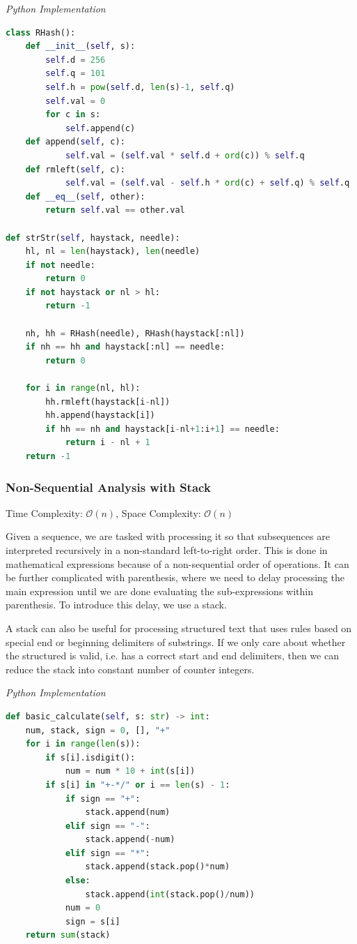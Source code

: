\documentclass{article}
\newcommand{\bigO}{\mathcal{O}}
\begin{document}
\vspace{8pt} \emph{Python Implementation}
\begin{lstlisting}[language=Python]    
class RHash():
    def __init__(self, s):
        self.d = 256
        self.q = 101
        self.h = pow(self.d, len(s)-1, self.q)
        self.val = 0
        for c in s:
            self.append(c)
    def append(self, c):
            self.val = (self.val * self.d + ord(c)) % self.q
    def rmleft(self, c):
            self.val = (self.val - self.h * ord(c) + self.q) % self.q 
    def __eq__(self, other):            
        return self.val == other.val
        
def strStr(self, haystack, needle):
    hl, nl = len(haystack), len(needle)
    if not needle:
        return 0
    if not haystack or nl > hl:
        return -1
  
    nh, hh = RHash(needle), RHash(haystack[:nl])
    if nh == hh and haystack[:nl] == needle:
        return 0
    
    for i in range(nl, hl):
        hh.rmleft(haystack[i-nl])
        hh.append(haystack[i])
        if hh == nh and haystack[i-nl+1:i+1] == needle:
            return i - nl + 1
    return -1
\end{lstlisting}

\subsubsection{Non-Sequential Analysis with Stack}
Time Complexity: $\bigO(n)$, Space Complexity: $\bigO(n)$

Given a sequence, we are tasked with processing it so that subsequences are interpreted recursively in a non-standard left-to-right order. This is done in mathematical expressions because of a non-sequential order of operations. It can be further complicated with parenthesis, where we need to delay processing the main expression until we are done evaluating the sub-expressions within parenthesis. To introduce this delay, we use a stack.

A stack can also be useful for processing structured text that uses rules based on special end or beginning delimiters of substrings. If we only care about whether the structured is valid, i.e. has a correct start and end delimiters, then we can reduce the stack into constant number of counter integers.

\vspace{8pt} \emph{Python Implementation}
\begin{lstlisting}[language=Python]
def basic_calculate(self, s: str) -> int:
    num, stack, sign = 0, [], "+"
    for i in range(len(s)):
        if s[i].isdigit():
            num = num * 10 + int(s[i])
        if s[i] in "+-*/" or i == len(s) - 1:
            if sign == "+":
                stack.append(num)
            elif sign == "-":
                stack.append(-num)
            elif sign == "*":
                stack.append(stack.pop()*num)
            else:
                stack.append(int(stack.pop()/num))
            num = 0
            sign = s[i]
    return sum(stack)
\end{lstlisting}
\end{document}
